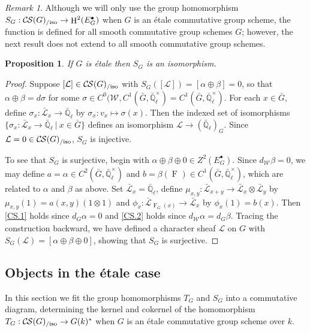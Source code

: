 \documentclass[10pt]{amsart}
\theoremstyle{plain}
\newtheorem{proposition}[theorem]{Proposition}
\theoremstyle{definition}
\theoremstyle{remark}
\newtheorem{remark}[theorem]{Remark}
\newcommand{\EE}{\mathbb{\bar Q}_\ell}
\newcommand{\Fq}{k}
\newcommand{\EEx}{\EE^\times}
\newcommand{\Weil}[1]{\mathcal{W}_{#1}}
\newcommand{\Frob}[1]{\operatorname{F}_{#1}}
\DeclareMathOperator{\Hh}{H}
\newcommand{\tq}{{\ \vert\ }}
\newcommand{\TrFrob}[1]{T_{#1}}
\newcommand{\cs}[1]{{\mathcal{#1}}}
\newcommand{\gcs}[1]{{\mathcal{\bar #1}}}
\newcommand{\CS}{{\mathcal{C\hskip-0.8pt S}}}
\newcommand{\CSiso}[1]{\CS(#1)_{/\text{iso}}}
\begin{document}
\begin{remark}
Although we will only use the group homomorphism $S_G : \CSiso{G}\to \Hh^2(E^\bullet_G)$ when $G$ is an \'etale commutative group scheme, the function is defined for all smooth commutative group schemes $G$;
however, the next result does not extend to all smooth commutative group schemes.
\end{remark}

\begin{proposition}\label{prop:SGiso}
If $G$ is \'etale then $S_G$ is an isomorphism.
\end{proposition}
\begin{proof}
Suppose $[\cs{L}] \in \CSiso{G}$ with $S_G([\cs{L}]) = [\alpha \oplus \beta] = 0$,
so that $\alpha \oplus \beta = d\sigma$ for some $\sigma \in C^0(\Weil{},C^1({\bar G},\EEx) = C^1({\bar G},\EEx)$.
For each $x\in {\bar G}$, define $\sigma_x : \gcs{L}_x \to \EE$ by $\sigma_x : v_x \mapsto \sigma(x)$.
Then the indexed set of isomorphisms $\{ \sigma_x : \gcs{L}_x \to \EE \tq x\in {\bar G}\}$
defines an isomorphism $\cs{L} \to (\EE)_G$.
Since $\cs{L} = 0 \in \CSiso{G}$, $S_G$ is injective.

To see that $S_G$ is surjective, begin with $\alpha\oplus\beta\oplus 0 \in Z^2(E^\bullet_G)$.
Since $d_{\Weil{}} \beta = 0$, we may define $a = \alpha \in C^2({\bar G},\EEx)$ and
$b = \beta(\Frob{}) \in C^1({\bar G},\EEx)$, which are related to $\alpha$ and $\beta$ as above.
Set $\gcs{L}_x = \EE$, define $\mu_{x,y} : \gcs{L}_{x+y} \to \gcs{L}_x\otimes\gcs{L}_y$
by $\mu_{x,y}(1) = a(x,y) (1\otimes 1)$ and $\phi_x : \gcs{L}_{\Frob{G}(x)} \to \gcs{L}_x$ by $\phi_x(1)= b(x)$.
Then \ref{CS.1} holds since $d_G \alpha =0$ and \ref{CS.2} holds since $d_{\Weil{}}\alpha =d_G \beta$.
Tracing the construction backward, we have defined a character sheaf $\cs{L}$ on $G$ with
$S_G(\cs{L}) = [\alpha\oplus\beta\oplus 0]$, showing that $S_G$ is surjective.
\end{proof}


\subsection{Objects in the \'etale case}\label{ssec:SandT}

In this section we fit the group homomorphisms $\TrFrob{G}$ and $S_G$ into a commutative diagram, determining the kernel and cokernel of the homomorphism $\TrFrob{G} : \CSiso{G} \to G(k)^*$ when $G$ is an \'etale commutative group scheme over $\Fq$.
\end{document}
